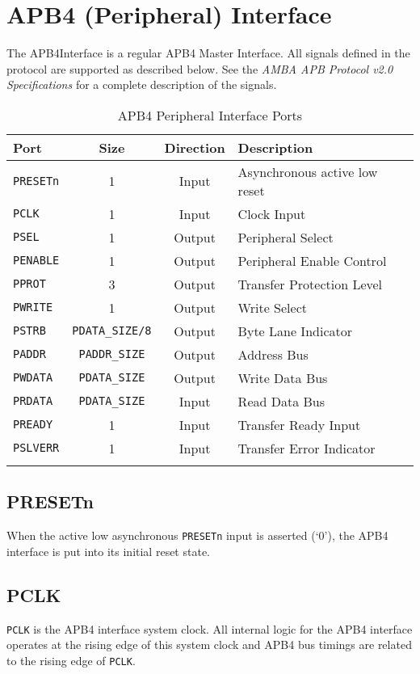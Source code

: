 \section{APB4 (Peripheral)
Interface}\label{apb4-peripheral-interface}

The APB4Interface is a regular APB4 Master Interface. All signals
defined in the protocol are supported as described below. See the
\emph{AMBA APB Protocol v2.0 Specifications} for a complete description
of the signals.

\begin{longtable}[]{@{}lccl@{}}
\toprule
\textbf{Port} & \textbf{Size} & \textbf{Direction} & \textbf{Description}\tabularnewline
\midrule
\endhead
\texttt{PRESETn} & 1 & Input & Asynchronous active low reset\tabularnewline
\texttt{PCLK} & 1 & Input & Clock Input\tabularnewline
\texttt{PSEL} & 1 & Output & Peripheral Select\tabularnewline
\texttt{PENABLE} & 1 & Output & Peripheral Enable Control\tabularnewline
\texttt{PPROT} & 3 & Output & Transfer Protection Level\tabularnewline
\texttt{PWRITE} & 1 & Output & Write Select\tabularnewline
\texttt{PSTRB} & \texttt{PDATA\_SIZE/8} & Output & Byte Lane Indicator\tabularnewline
\texttt{PADDR} & \texttt{PADDR\_SIZE} & Output & Address Bus\tabularnewline
\texttt{PWDATA} & \texttt{PDATA\_SIZE} & Output & Write Data Bus\tabularnewline
\texttt{PRDATA} & \texttt{PDATA\_SIZE} & Input & Read Data Bus\tabularnewline
\texttt{PREADY} & 1 & Input & Transfer Ready Input\tabularnewline
\texttt{PSLVERR} & 1 & Input & Transfer Error Indicator\tabularnewline
\bottomrule
\caption{APB4 Peripheral Interface Ports}
\end{longtable}

\subsection{PRESETn}\label{presetn}

When the active low asynchronous \texttt{PRESETn} input is asserted (`0'), the
APB4 interface is put into its initial reset state.

\subsection{PCLK}\label{pclk}

\texttt{PCLK} is the APB4 interface system clock. All internal logic for the APB4
interface operates at the rising edge of this system clock and APB4 bus
timings are related to the rising edge of \texttt{PCLK}.

